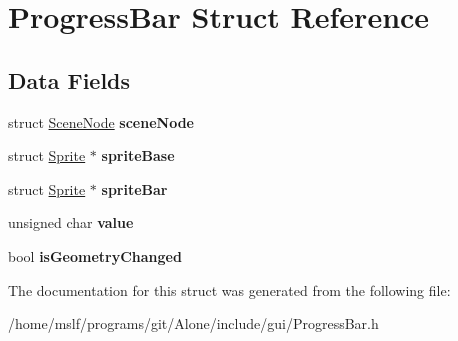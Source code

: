 \hypertarget{struct_progress_bar}{}\section{Progress\+Bar Struct Reference}
\label{struct_progress_bar}
\subsection*{Data Fields}
\begin{DoxyCompactItemize}
\item 
\hypertarget{struct_progress_bar_aca8025f56fb4ce20b974ec9a3292a9e4}{}\label{struct_progress_bar_aca8025f56fb4ce20b974ec9a3292a9e4} 
struct \hyperlink{struct_scene_node}{Scene\+Node} {\bfseries scene\+Node}
\item 
\hypertarget{struct_progress_bar_a415c2cf0f85f8877a0b5db473ae1a9ef}{}\label{struct_progress_bar_a415c2cf0f85f8877a0b5db473ae1a9ef} 
struct \hyperlink{struct_sprite}{Sprite} $\ast$ {\bfseries sprite\+Base}
\item 
\hypertarget{struct_progress_bar_aa77bb96f1837c2ce8c1d2c0f3f3f8bb1}{}\label{struct_progress_bar_aa77bb96f1837c2ce8c1d2c0f3f3f8bb1} 
struct \hyperlink{struct_sprite}{Sprite} $\ast$ {\bfseries sprite\+Bar}
\item 
\hypertarget{struct_progress_bar_a537893029f1863ac865b24ec727c24b8}{}\label{struct_progress_bar_a537893029f1863ac865b24ec727c24b8} 
unsigned char {\bfseries value}
\item 
\hypertarget{struct_progress_bar_a8ea7e8ac3e3330830aa7a4309390f3ac}{}\label{struct_progress_bar_a8ea7e8ac3e3330830aa7a4309390f3ac} 
bool {\bfseries is\+Geometry\+Changed}
\end{DoxyCompactItemize}


The documentation for this struct was generated from the following file\+:\begin{DoxyCompactItemize}
\item 
/home/mslf/programs/git/\+Alone/include/gui/Progress\+Bar.\+h\end{DoxyCompactItemize}
